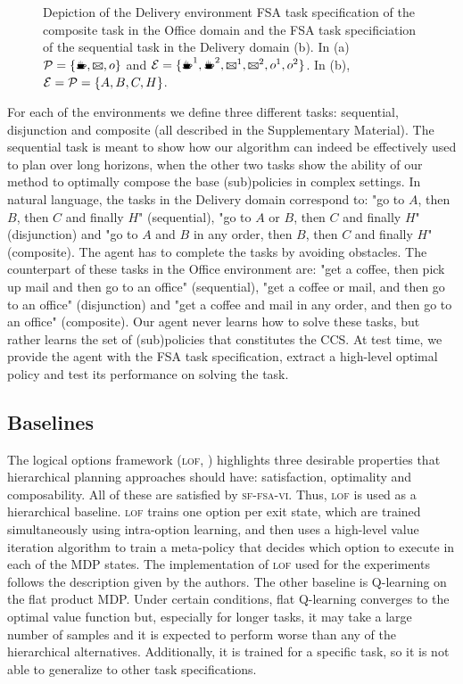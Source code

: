 \begin{figure}[!tb]
    \centering
    
  \caption{Depiction of the Delivery environment FSA task specification of the composite task in the Office domain and the FSA task specificiation of the sequential task in the Delivery domain (b). In (a) $\cP=\{\text{\coffee}, \text{\mail}, o\}$ and $\cE=\{\text{\coffee}^1,\text{\coffee}^2, \text{\mail}^1,\text{\mail}^2, o^1, o^2\}$. In (b), $\mathcal{E}=\mathcal{P}=\{A, B, C, H\}$.}
 \label{fig:delivery}
\end{figure}

For each of the environments we define three different tasks: sequential, disjunction and composite (all described in the Supplementary Material). The sequential task is meant to show how our algorithm can indeed be effectively used to plan over long horizons, when the other two tasks show the ability of our method to optimally compose the base (sub)policies in complex settings. In natural language, the tasks in the Delivery domain correspond to: "go to $A$, then $B$, then $C$ and finally $H$"  (sequential), "go to $A$ or $B$, then $C$ and finally $H$" (disjunction) and "go to $A$ and $B$ in any order, then $B$, then $C$ and finally $H$" (composite). The agent has to complete the tasks by avoiding obstacles. The counterpart of these tasks in the Office environment are: "get a coffee, then pick up mail and then go to an office" (sequential), "get a coffee or mail, and then go to an office" (disjunction) and "get a coffee and mail in any order, and then go to an office" (composite). 
Our agent never learns how to solve these tasks, but rather learns the set of (sub)policies that constitutes the CCS. At test time, we provide the agent with the FSA task specification, extract a high-level optimal policy and test its performance on solving the task.

\subsection{Baselines} The logical options framework (\textsc{lof}, \citet{Araki2021}) highlights three desirable properties that hierarchical planning approaches should have: satisfaction, optimality and composability. All of these are satisfied by \textsc{sf-fsa-vi}. Thus, \textsc{lof} is used as a hierarchical baseline. \textsc{\textsc{lof}} trains one option per exit state, which are trained simultaneously using intra-option learning, and then uses a high-level value iteration algorithm to train a meta-policy that decides which option to execute in each of the MDP states. The implementation of \textsc{lof} used for the experiments follows the description given by the authors. The other baseline is Q-learning on the flat product MDP. Under certain conditions, flat Q-learning converges to the optimal value function but, especially for longer tasks, it may take a large number of samples and it is expected to perform worse than any of the hierarchical alternatives. Additionally, it is trained for a specific task, so it is not able to generalize to other task specifications. 

